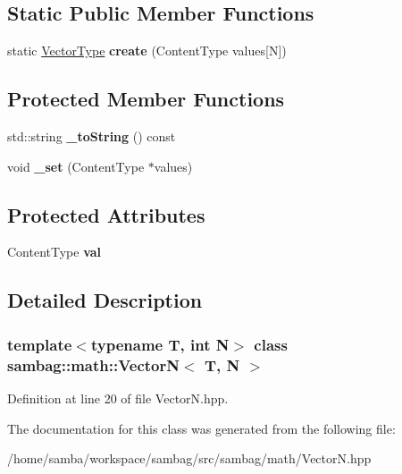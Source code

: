 \subsection*{Static Public Member Functions}
\begin{DoxyCompactItemize}
\item 
\hypertarget{classsambag_1_1math_1_1_vector_n_a9c6bc2fd69015a1dfc33b07d83d3998e}{
static \hyperlink{classsambag_1_1math_1_1_vector_n}{VectorType} {\bfseries create} (ContentType values\mbox{[}N\mbox{]})}
\label{classsambag_1_1math_1_1_vector_n_a9c6bc2fd69015a1dfc33b07d83d3998e}

\end{DoxyCompactItemize}
\subsection*{Protected Member Functions}
\begin{DoxyCompactItemize}
\item 
\hypertarget{classsambag_1_1math_1_1_vector_n_a941267fdf1daea1cee546d127a2c2078}{
std::string {\bfseries \_\-toString} () const }
\label{classsambag_1_1math_1_1_vector_n_a941267fdf1daea1cee546d127a2c2078}

\item 
\hypertarget{classsambag_1_1math_1_1_vector_n_a55a92eeac5cdda7612bffed97ac6d9c1}{
void {\bfseries \_\-set} (ContentType $\ast$values)}
\label{classsambag_1_1math_1_1_vector_n_a55a92eeac5cdda7612bffed97ac6d9c1}

\end{DoxyCompactItemize}
\subsection*{Protected Attributes}
\begin{DoxyCompactItemize}
\item 
\hypertarget{classsambag_1_1math_1_1_vector_n_af5c2c75d8daa95e93d28692bc841d23c}{
ContentType {\bfseries val}}
\label{classsambag_1_1math_1_1_vector_n_af5c2c75d8daa95e93d28692bc841d23c}

\end{DoxyCompactItemize}


\subsection{Detailed Description}
\subsubsection*{template$<$typename T, int N$>$ class sambag::math::VectorN$<$ T, N $>$}



Definition at line 20 of file VectorN.hpp.



The documentation for this class was generated from the following file:\begin{DoxyCompactItemize}
\item 
/home/samba/workspace/sambag/src/sambag/math/VectorN.hpp\end{DoxyCompactItemize}
